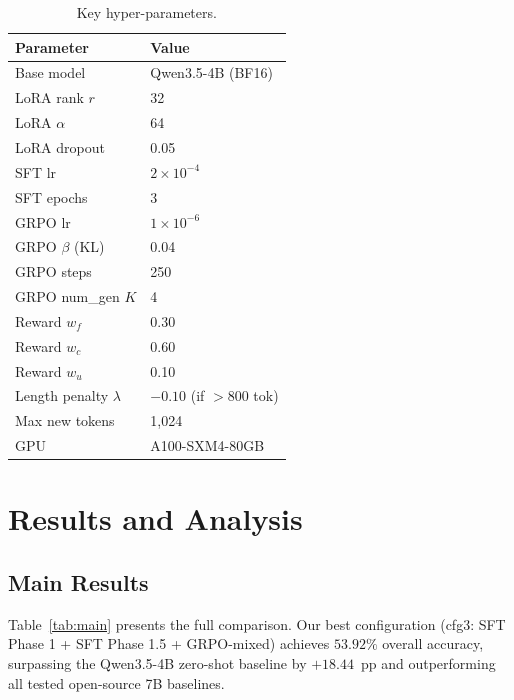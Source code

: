 \documentclass{ieeeaccess}
\newcommand{\basemodelname}{Qwen3.5-4B}
\begin{document}
\begin{table}[t]
  \centering
  \caption{Key hyper-parameters.}
  \label{tab:hyperparams}
  \begin{tabular}{ll}
    \toprule
    Parameter & Value \\
    \midrule
    Base model         & \basemodelname{} (BF16) \\
    LoRA rank $r$      & 32 \\
    LoRA $\alpha$      & 64 \\
    LoRA dropout       & 0.05 \\
    SFT lr             & $2\times10^{-4}$ \\
    SFT epochs         & 3 \\
    GRPO lr            & $1\times10^{-6}$ \\
    GRPO $\beta$ (KL)  & 0.04 \\
    GRPO steps         & 250 \\
    GRPO num\_gen $K$  & 4 \\
    Reward $w_f$       & 0.30 \\
    Reward $w_c$       & 0.60 \\
    Reward $w_u$       & 0.10 \\
    Length penalty $\lambda$ & $-0.10$ (if $>$800 tok) \\
    Max new tokens     & 1,024 \\
    GPU                & A100-SXM4-80GB \\
    \bottomrule
  \end{tabular}
\end{table}

\section{Results and Analysis}
\label{sec:results}

\subsection{Main Results}

Table~\ref{tab:main} presents the full comparison.
Our best configuration (cfg3: SFT Phase 1 + SFT Phase 1.5 + GRPO-mixed)
achieves $53.92\%$ overall accuracy, surpassing the
\basemodelname{} zero-shot baseline by $+18.44$~pp and outperforming
all tested open-source 7B baselines.
\end{document}
